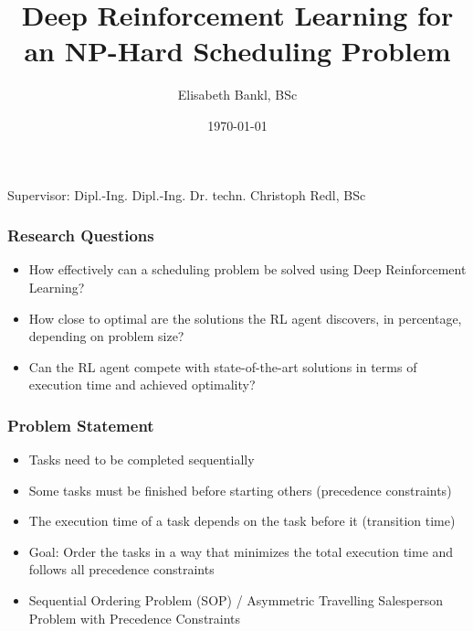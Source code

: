 \documentclass{beamer}
\title{Deep Reinforcement Learning for an NP-Hard Scheduling Problem}
\author{Elisabeth Bankl, BSc}
\institute{FH Technikum Wien}
\date{\today}
\begin{document}
\begin{frame}
    \titlepage
    \vspace{-1cm} %
    \begin{center}
        Supervisor: Dipl.-Ing. Dipl.-Ing. Dr. techn. Christoph Redl, BSc
    \end{center}
\end{frame}


\begin{frame}
    \frametitle{Research Questions}
    \begin{itemize}
\item How effectively can a scheduling problem be solved using Deep Reinforcement
 Learning?
 \item How close to optimal are the solutions the RL agent discovers, in percentage,
 depending on problem size?
 \item Can the RL agent compete with state-of-the-art solutions in terms of
 execution time and achieved optimality?
\end{itemize}
\end{frame}

\begin{frame}
    \frametitle{Problem Statement}
    \begin{itemize}
        \item Tasks need to be completed sequentially
        \item Some tasks must be finished before starting others (precedence constraints)
        \item The execution time of a task depends on the task before it (transition time)
        \item Goal: Order the tasks in a way that minimizes the total execution time and follows all precedence constraints
        \item Sequential Ordering Problem (SOP) / Asymmetric Travelling Salesperson Problem with Precedence Constraints

    \end{itemize}
\end{frame}
\end{document}
